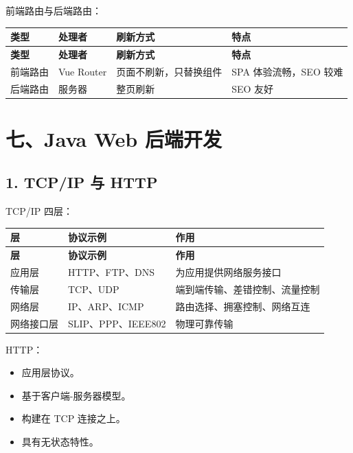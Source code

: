 \documentclass[UTF8,zihao=-4]{ctexart}
\begin{document}
前端路由与后端路由：

{
\footnotesize
\begin{longtable}{|>{\raggedright\arraybackslash}p{}|>{\raggedright\arraybackslash}p{}|>{\raggedright\arraybackslash}p{}|>{\raggedright\arraybackslash}p{}|}
\hline
\textbf{类型} & \textbf{处理者} & \textbf{刷新方式} & \textbf{特点} \\
\hline
\endfirsthead
\hline
\textbf{类型} & \textbf{处理者} & \textbf{刷新方式} & \textbf{特点} \\
\hline
\endhead
前端路由 & Vue Router & 页面不刷新，只替换组件 & SPA 体验流畅，SEO 较难 \\
\hline
后端路由 & 服务器 & 整页刷新 & SEO 友好 \\
\hline
\end{longtable}
}


\section{七、Java Web 后端开发}

\subsection{1. TCP/IP 与 HTTP}

TCP/IP 四层：

{
\footnotesize
\begin{longtable}{|>{\raggedright\arraybackslash}p{}|>{\raggedright\arraybackslash}p{}|>{\raggedright\arraybackslash}p{}|}
\hline
\textbf{层} & \textbf{协议示例} & \textbf{作用} \\
\hline
\endfirsthead
\hline
\textbf{层} & \textbf{协议示例} & \textbf{作用} \\
\hline
\endhead
应用层 & HTTP、FTP、DNS & 为应用提供网络服务接口 \\
\hline
传输层 & TCP、UDP & 端到端传输、差错控制、流量控制 \\
\hline
网络层 & IP、ARP、ICMP & 路由选择、拥塞控制、网络互连 \\
\hline
网络接口层 & SLIP、PPP、IEEE802 & 物理可靠传输 \\
\hline
\end{longtable}
}


HTTP：

\begin{itemize}
\item 应用层协议。
\item 基于客户端-服务器模型。
\item 构建在 TCP 连接之上。
\item 具有无状态特性。
\end{itemize}
\end{document}
